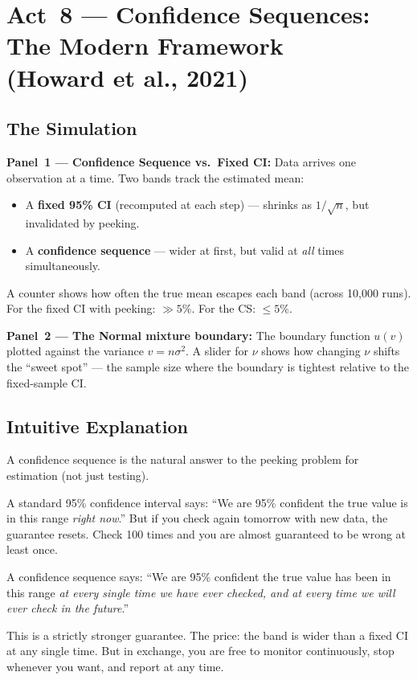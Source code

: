 \documentclass[12pt, a4paper]{article}
\begin{document}
\newpage
\section{Act~8 --- Confidence Sequences: The Modern Framework\\ (Howard et al., 2021)}

\subsection{The Simulation}

\begin{simulation}
\textbf{Panel~1 --- Confidence Sequence vs.\ Fixed CI:}
Data arrives one observation at a time.  Two bands track the estimated mean:
\begin{itemize}[nosep]
  \item A \textbf{fixed 95\% CI} (recomputed at each step) --- shrinks as
        $1/\sqrt{n}$, but invalidated by peeking.
  \item A \textbf{confidence sequence} --- wider at first, but valid at
        \emph{all} times simultaneously.
\end{itemize}
A counter shows how often the true mean escapes each band (across 10,000
runs).  For the fixed CI with peeking: $\gg 5\%$.  For the CS: $\leq 5\%$.

\textbf{Panel~2 --- The Normal mixture boundary:}
The boundary function $u(v)$ plotted against the variance $v = n\sigma^2$.
A slider for $\nu$ shows how changing $\nu$ shifts the ``sweet spot'' ---
the sample size where the boundary is tightest relative to the fixed-sample
CI.
\end{simulation}

\subsection{Intuitive Explanation}

\begin{intuition}
A confidence sequence is the natural answer to the peeking problem for
estimation (not just testing).

A standard 95\% confidence interval says: ``We are 95\% confident the true
value is in this range \emph{right now}.''  But if you check again tomorrow
with new data, the guarantee resets.  Check 100 times and you are almost
guaranteed to be wrong at least once.

A confidence sequence says: ``We are 95\% confident the true value has been
in this range \emph{at every single time we have ever checked, and at every
time we will ever check in the future}.''

This is a strictly stronger guarantee.  The price: the band is wider than a
fixed CI at any single time.  But in exchange, you are free to monitor
continuously, stop whenever you want, and report at any time.
\end{intuition}
\end{document}
